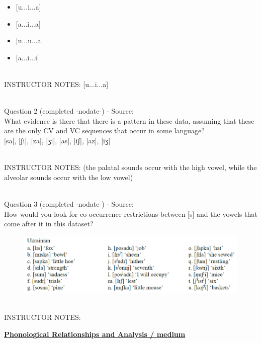 \documentclass[12pt]{article}
\begin{document}
\begin{itemize} \item {[u...i...a]} \item {[a...i...a]} \item {[u...u...a]} \item {[a...i...i]} \end{itemize}


~\\
INSTRUCTOR NOTES: [u...i...a]


~\\

{\large Question 2} (completed -nodate-) - Source: \\

What evidence is there that there is a pattern in these data, assuming that these are the only CV and VC sequences that occur in some language?\\

{[sa]}, {[ʃi]}, {[za]}, {[ʒi]}, {[as]}, {[iʃ]}, {[az]}, {[iʒ]}


~\\
INSTRUCTOR NOTES: (the palatal sounds occur with the high vowel, while the alveolar sounds occur with the low vowel)


~\\

{\large Question 3} (completed -nodate-) - Source: \\

How would you look for co-occurrence restrictions between [s] and the vowels that come after it in this dataset?\\

\begin{figure}[H]
\includegraphics{../images/ukrainian.png}
\end{figure}

~\\
INSTRUCTOR NOTES: 


\newpage\textbf{\underline{\huge Phonological Relationships and Analysis / medium\\}}

~\\
\end{document}
